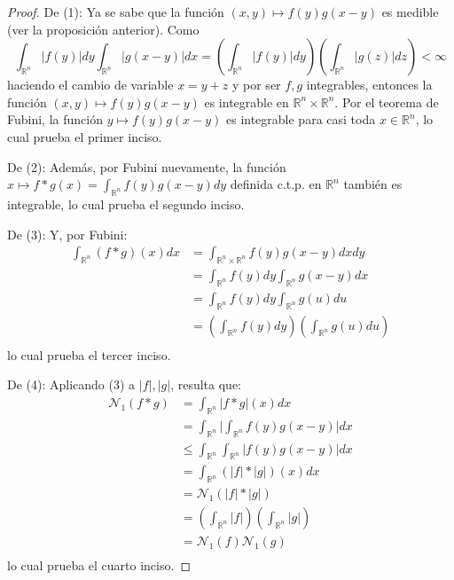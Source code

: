 \documentclass[12pt]{report}
\theoremstyle{largebreak}
\newcommand\abs[1]{\ensuremath{\big|#1\big|}}
\newcommand{\N}[2]{\ensuremath{\mathcal{N}_{#1}\left(#2\right)}}
\begin{document}
    \begin{proof}
        De (1): Ya se sabe que la función $(x,y)\mapsto f(y)g(x-y)$ es medible (ver la proposición anterior). Como
        \begin{equation*}
            \int_{\mathbb{R}^n}\abs{f(y)}dy\int_{\mathbb{R}^n}\abs{g(x-y)}dx=\left(\int_{\mathbb{R}^n}\abs{f(y)}dy \right)\left(\int_{\mathbb{R}^n}\abs{g(z)}dz \right)<\infty
        \end{equation*}
        haciendo el cambio de variable $x=y+z$ y por ser $f,g$ integrables, entonces la función $(x,y)\mapsto f(y)g(x-y)$ es integrable en $\mathbb{R}^n\times \mathbb{R}^n$. Por el teorema de Fubini, la función $y\mapsto f(y)g(x-y)$ es integrable para casi toda $x\in\mathbb{R}^n$, lo cual prueba el primer inciso.

        De (2): Además, por Fubini nuevamente, la función $x\mapsto f*g(x)=\int_{\mathbb{R}^n}f(y)g(x-y)dy$ definida c.t.p. en $\mathbb{R}^n$ también es integrable, lo cual prueba el segundo inciso.

        De (3): Y, por Fubini:
        \begin{equation*}
            \begin{split}
                \int_{\mathbb{R}^n}(f*g)(x)dx&=\int_{ \mathbb{R}^n\times\mathbb{R}^n}f(y)g(x-y)dxdy\\
                &=\int_{\mathbb{R}^n}f(y)dy\int_{\mathbb{R}^n}g(x-y)dx\\
                &=\int_{\mathbb{R}^n}f(y)dy\int_{\mathbb{R}^n}g(u)du\\
                &=\left(\int_{\mathbb{R}^n}f(y)dy\right)\left(\int_{\mathbb{R}^n}g(u)du\right) \\
            \end{split}
        \end{equation*}
        lo cual prueba el tercer inciso.

        De (4): Aplicando (3) a $\abs{f},\abs{g}$, resulta que:
        \begin{equation*}
            \begin{split}
                \N{1}{f*g}&=\int_{\mathbb{R}^n}\abs{f*g}(x)dx\\
                &=\int_{\mathbb{R}^n}\abs{\int_{\mathbb{R}^n}f(y)g(x-y)}dx\\
                &\leq\int_{\mathbb{R}^n}\int_{\mathbb{R}^n}\abs{f(y)g(x-y)}dx\\
                &=\int_{\mathbb{R}^n}(\abs{f}*\abs{g})(x)dx\\
                &=\N{1}{\abs{f}*\abs{g}}\\
                &=\left(\int_{\mathbb{R}^n}\abs{f} \right)\left(\int_{\mathbb{R}^n}\abs{g} \right)\\
                &=\N{1}{f}\N{1}{g}\\
            \end{split}
        \end{equation*}
        lo cual prueba el cuarto inciso.
    \end{proof}
\end{document}
